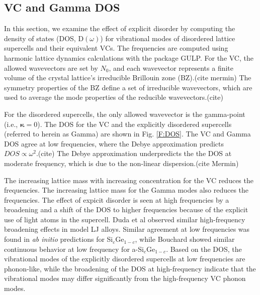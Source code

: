 \documentclass[aps,prb,onecolumn,preprint,superscriptaddress,amsmath,amssymb,floatfix]{revtex4}
\begin{document}
\subsection{\label{S:VC Gamma DOS}VC and Gamma DOS}

In this section, we examine the effect of explicit disorder by computing 
the density of states (DOS, D$(\omega)$) for vibrational modes of  
disordered lattice supercells and their 
equivalent VCs. The frequencies 
are computed using harmonic lattice dynamics calculations with the package 
GULP.\cite{gale_general_2003} For the 
VC, the allowed wavevectors are set by $N_0$, and each wavevector 
represents a finite volume of the crystal lattice's irreducible 
Brillouin zone (BZ).(cite mermin) The symmetry properties of the BZ 
define a set of irreducible wavevectors, which are used to average 
the mode properties of the reducible wavevectors.(cite) 

For the disordered 
supercells,
the only allowed wavevector is the gamma-point (i.e., $\pmb{\kappa}=0$). 
The DOS for the VC and the explicitly disordered supercells 
(referred to herein as Gamma) are shown in Fig. \ref{F:DOS}. 
The VC and Gamma DOS 
agree at low frequencies, where the Debye approximation predicts 
$DOS \propto \omega^2$.(cite) The Debye approximation 
underpredicts the the DOS at moderate frequency, which is due to the 
non-linear dispersion.(cite Mermin)

The increasing lattice 
mass with increasing concentration for the VC reduces  
the frequencies. The increasing lattice 
mass for the Gamma modes also reduces the frequencies.
The effect of expicit disorder is seen at high frequencies by a 
broadening and a shift of the DOS to higher frequencies 
because of the explicit use of light atoms in the supercell. 
Duda et al 
observed similar high-frequency broadening effects in model LJ alloys.
\cite{duda_reducing_2011} 
Similar agreement at low frequencies was found in \emph{ab initio} 
predictions 
for Si$_c$Ge$_{1-c}$,\cite{garg_role_2011} while Bouchard showed similar 
continuous behavior at low frequency for 
a-Si$_c$Ge$_{1-c}$.\cite{bouchard_vibrational_1988} 
Based on the DOS, the vibrational modes of the explicitly disordered 
supercells at low frequencies are phonon-like, while the broadening 
of the DOS at high-frequency indicate that the vibrational modes 
may differ significantly from the high-frequency VC phonon modes.
\end{document}
